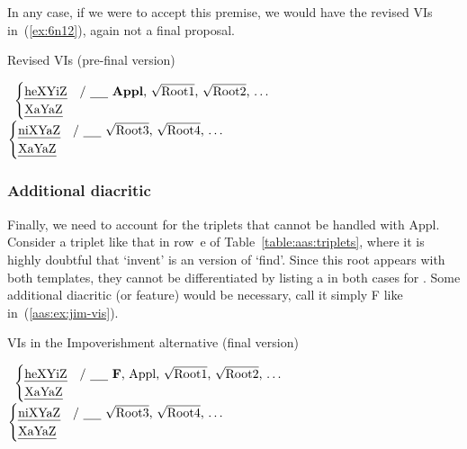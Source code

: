\begin{exe}
\begin{xlist}
\begin{exe}
\begin{exe}
\begin{xlist}
\begin{exe}
\begin{exe}
\begin{exe}
\begin{exe}
\begin{exe}
\begin{xlist}
\begin{exe}
\begin{exe}
\begin{xlist}
\begin{exe}
\begin{xlist}
In any case, if we were to accept this premise, we would have the revised VIs in~(\ref{ex:6n12}), again not a final proposal.

 \begin{exe}
 \ex  \label{ex:6n12}Revised VIs (pre-final version) 
 \begin{xlist} 
 	\ex  {\vds} \lra~$\begin{cases} 
		\text{\thif} & \text{/ \trace~\textbf{Appl}, \root{Root1}, \root{Root2}, \dots}\\
		\text{\tkal} & \\
		\end{cases}$
 	\ex  {\vzs} \lra~$\begin{cases} 
		\text{\tnif} & \text{/ \trace~\root{Root3}, \root{Root4}, \dots}\\
		\text{\tkal} & \\
		\end{cases}$
 \z
\z 

		\subsubsection{Additional diacritic}
Finally, we need to account for the triplets that cannot be handled with Appl. Consider a triplet like that in row~e of Table~\ref{table:aas:triplets}, where it is highly doubtful that `invent' is an  version of `find'. Since this root appears with both templates, they cannot be differentiated by listing a  in both cases for {\vds}. Some additional diacritic (or feature) would be necessary, call it simply F like in~(\ref{aas:ex:jim-vis}).

 \begin{exe}
 \ex  \label{aas:ex:jim-vis}VIs in the Impoverishment alternative (final version) 
 \begin{xlist} 
 	\ex  {\vds} \lra~$\begin{cases} 
		\text{\thif} & \text{/ \trace~\textbf{F}, Appl, \root{Root1}, \root{Root2}, \dots}\\
		\text{\tkal} & \\
		\end{cases}$
 	\ex  {\vzs} \lra~$\begin{cases} 
		\text{\tnif} & \text{/ \trace~\root{Root3}, \root{Root4}, \dots}\\
		\text{\tkal} & \\
		\end{cases}$
 \z
\z 

	

\end{xlist}
\end{exe}
\end{xlist}
\end{exe}
\end{xlist}
\end{exe}
\end{xlist}
\end{exe}
\end{exe}
\end{xlist}
\end{exe}
\end{exe}
\end{exe}
\end{exe}
\end{exe}
\end{xlist}
\end{exe}
\end{exe}
\end{xlist}
\end{exe}
